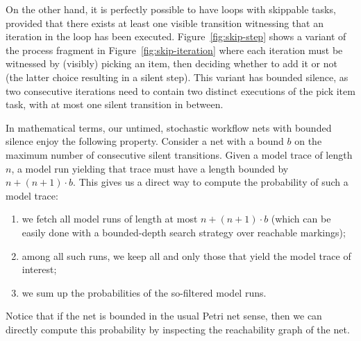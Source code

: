 On the other hand, it is perfectly possible to have loops with skippable tasks, provided that there exists at least one visible transition witnessing that an iteration in the loop has been executed. Figure~\ref{fig:skip-step} shows a variant of the process fragment in Figure~\ref{fig:skip-iteration} where each iteration must be witnessed by (visibly) picking an item, then deciding whether to add it or not (the latter choice resulting in a silent step). This variant has bounded silence, as two consecutive iterations need to contain two distinct executions of the \textsf{pick item} task, with at most one silent transition in between.


In mathematical terms, our untimed, stochastic workflow nets with bounded silence enjoy the following property. Consider a net with a bound $b$ on the maximum number of consecutive silent transitions. Given a model trace of length $n$, a model run yielding that trace must have a length bounded by $n+(n+1)\cdot b$. This gives us a direct way to compute the probability of such a model trace:
\begin{enumerate}
\item  we fetch all model runs of length at most $n+(n+1)\cdot b$ (which can be easily done with a bounded-depth search strategy over reachable markings);
\item among all such runs, we keep all and only those that yield the model trace of interest;
\item we sum up the probabilities of the so-filtered model runs.
\end{enumerate}

Notice that if the net is bounded in the usual Petri net sense, then we can directly compute this probability by inspecting the reachability graph of the net.















